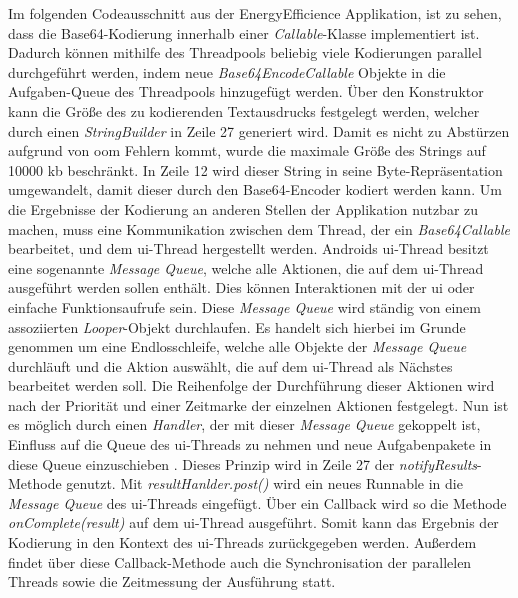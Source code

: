 Im folgenden Codeausschnitt aus der \glqq EnergyEfficience\grqq{} Applikation, ist zu sehen, dass die Base64-Kodierung innerhalb einer \emph{Callable}-Klasse implementiert ist. Dadurch können mithilfe des Threadpools beliebig viele Kodierungen parallel durchgeführt werden, indem neue \emph{Base64EncodeCallable} Objekte in die Aufgaben-Queue des Threadpools hinzugefügt werden. Über den Konstruktor kann die Größe des zu kodierenden Textausdrucks festgelegt werden, welcher durch einen \emph{StringBuilder} in Zeile 27 generiert wird. Damit es nicht zu Abstürzen aufgrund von \ac{oom} Fehlern kommt, wurde die maximale Größe des Strings auf 10000 \ac{kb} beschränkt. In Zeile 12 wird dieser String in seine Byte-Repräsentation umgewandelt, damit dieser durch den Base64-Encoder kodiert werden kann. Um die Ergebnisse der Kodierung an anderen Stellen der Applikation nutzbar zu machen, muss eine Kommunikation zwischen dem Thread, der ein \emph{Base64Callable} bearbeitet, und dem \ac{ui}-Thread hergestellt werden.  Androids \ac{ui}-Thread besitzt eine sogenannte \emph{Message Queue}, welche alle Aktionen, die auf dem \ac{ui}-Thread ausgeführt werden sollen enthält. Dies können Interaktionen mit der \ac{ui} oder einfache Funktionsaufrufe sein. Diese \emph{Message Queue} wird ständig von einem assoziierten \emph{Looper}-Objekt durchlaufen. Es handelt sich hierbei im Grunde genommen um eine Endlosschleife, welche alle Objekte der \emph{Message Queue} durchläuft und die Aktion auswählt, die auf dem \ac{ui}-Thread als Nächstes bearbeitet werden soll. Die Reihenfolge der Durchführung dieser Aktionen wird nach der Priorität und einer Zeitmarke der einzelnen Aktionen festgelegt. Nun ist es möglich durch einen \emph{Handler}, der mit dieser \emph{Message Queue} gekoppelt ist, Einfluss auf die Queue des \ac{ui}-Threads zu nehmen und neue Aufgabenpakete in diese Queue einzuschieben \cite{Handler}. Dieses Prinzip wird in Zeile 27 der \emph{notifyResults}-Methode genutzt. Mit \emph{resultHanlder.post()} wird ein neues Runnable in die \emph{Message Queue} des \ac{ui}-Threads eingefügt. Über ein Callback wird so die Methode \emph{onComplete(result)} auf dem \ac{ui}-Thread ausgeführt. Somit kann das Ergebnis der Kodierung in den Kontext des \ac{ui}-Threads zurückgegeben werden. Außerdem findet über diese Callback-Methode auch die Synchronisation der parallelen Threads sowie die Zeitmessung der Ausführung statt. 

